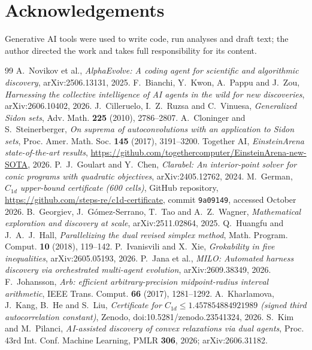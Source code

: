 \documentclass[11pt]{amsart}
\theoremstyle{definition}
\theoremstyle{remark}
\numberwithin{equation}{section}
\begin{document}
\section*{Acknowledgements}
Generative AI tools were used to write code, run analyses and draft text; the author directed the work and takes full responsibility for its content.

\begin{thebibliography}{99}
 A.~Novikov et al., \emph{AlphaEvolve: A coding agent for scientific and algorithmic discovery}, arXiv:2506.13131, 2025.
 F.~Bianchi, Y.~Kwon, A.~Pappu and J.~Zou, \emph{Harnessing the collective intelligence of AI agents in the wild for new discoveries}, arXiv:2606.10402, 2026.
 J.~Cilleruelo, I.~Z.~Ruzsa and C.~Vinuesa, \emph{Generalized Sidon sets}, Adv. Math. \textbf{225} (2010), 2786--2807.
 A.~Cloninger and S.~Steinerberger, \emph{On suprema of autoconvolutions with an application to Sidon sets}, Proc. Amer. Math. Soc. \textbf{145} (2017), 3191--3200.
 Together AI, \emph{EinsteinArena state-of-the-art results}, \url{https://github.com/togethercomputer/EinsteinArena-new-SOTA}, 2026.
 P.~J.~Goulart and Y.~Chen, \emph{Clarabel: An interior-point solver for conic programs with quadratic objectives}, arXiv:2405.12762, 2024.
 M.~German, \emph{$C_{1d}$ upper-bound certificate (600 cells)}, GitHub repository, \url{https://github.com/steps-re/c1d-certificate}, commit \texttt{9a09149}, accessed October 2026.
 B.~Georgiev, J.~G\'omez-Serrano, T.~Tao and A.~Z.~Wagner, \emph{Mathematical exploration and discovery at scale}, arXiv:2511.02864, 2025.
 Q.~Huangfu and J.~A.~J.~Hall, \emph{Parallelizing the dual revised simplex method}, Math. Program. Comput. \textbf{10} (2018), 119--142.
 P.~Ivanisvili and X.~Xie, \emph{Grokability in five inequalities}, arXiv:2605.05193, 2026.
 P.~Jana et al., \emph{MILO: Automated harness discovery via orchestrated multi-agent evolution}, arXiv:2609.38349, 2026.
 F.~Johansson, \emph{Arb: efficient arbitrary-precision midpoint-radius interval arithmetic}, IEEE Trans. Comput. \textbf{66} (2017), 1281--1292.
 A.~Kharlamova, J.~Kang, B.~He and S.~Liu, \emph{Certificate for $C_{1d}\le1.457854884921989$ (signed third autocorrelation constant)}, Zenodo, doi:10.5281/zenodo.23541324, 2026.
 S.~Kim and M.~Pilanci, \emph{AI-assisted discovery of convex relaxations via dual agents}, Proc. 43rd Int. Conf. Machine Learning, PMLR \textbf{306}, 2026; arXiv:2606.31182.

\end{thebibliography}
\end{document}
